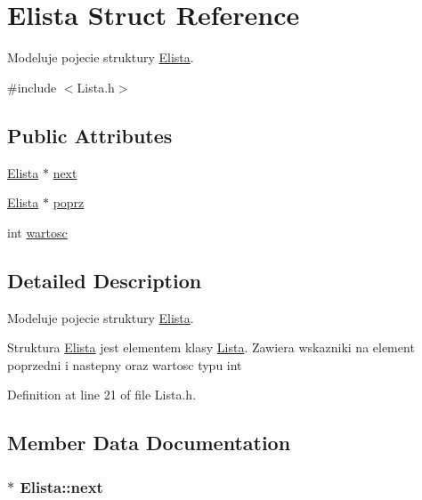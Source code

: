 \hypertarget{struct_elista}{\section{Elista Struct Reference}
\label{struct_elista}
}


Modeluje pojecie struktury \hyperlink{struct_elista}{Elista}.  




{\ttfamily \#include $<$Lista.\-h$>$}

\subsection*{Public Attributes}
\begin{DoxyCompactItemize}
\item 
\hyperlink{struct_elista}{Elista} $\ast$ \hyperlink{struct_elista_a2821644b4d0ca73d75a895cf326664da}{next}
\item 
\hyperlink{struct_elista}{Elista} $\ast$ \hyperlink{struct_elista_aa4bfee465e1ea4484c9aeddc2437e532}{poprz}
\item 
int \hyperlink{struct_elista_a8de211523404f6484098bc85dd1ce52b}{wartosc}
\end{DoxyCompactItemize}


\subsection{Detailed Description}
Modeluje pojecie struktury \hyperlink{struct_elista}{Elista}. 

Struktura \hyperlink{struct_elista}{Elista} jest elementem klasy \hyperlink{class_lista}{Lista}. Zawiera wskazniki na element poprzedni i nastepny oraz wartosc typu int 

Definition at line 21 of file Lista.\-h.



\subsection{Member Data Documentation}
\hypertarget{struct_elista_a2821644b4d0ca73d75a895cf326664da}{
\subsubsection[{next}]{$\ast$ Elista\-::next}}\label{struct_elista_a2821644b4d0ca73d75a895cf326664da}


